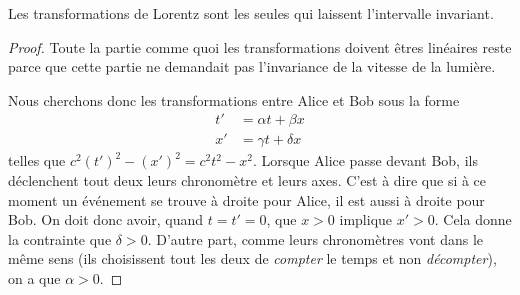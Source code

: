 \begin{theorem}
Les transformations de Lorentz sont les seules qui laissent l'intervalle invariant.
\end{theorem}

\begin{proof}
	Toute la partie comme quoi les transformations doivent êtres linéaires reste parce que cette partie ne demandait pas l'invariance de la vitesse de la lumière. 
    
    Nous cherchons donc les transformations entre Alice et Bob sous la forme
	\[ 
	\begin{split}
		t'&=\alpha t+\beta x\\
		x'&=\gamma t+\delta x
	\end{split}  
	\]
	telles que $c^2(t')^2-(x')^2=c^2t^2-x^2$. Lorsque Alice passe devant Bob, ils déclenchent tout deux leurs chronomètre et leurs axes. C'est à dire que si à ce moment un événement se trouve à droite pour Alice, il est aussi à droite pour Bob. On doit donc avoir, quand $t=t'=0$, que $x>0$ implique $x'>0$. Cela donne la contrainte que $\delta>0$. D'autre part, comme leurs chronomètres vont dans le même sens (ils choisissent tout les deux de \emph{compter} le temps et non \emph{décompter}), on a que $\alpha>0$.


\end{proof}
